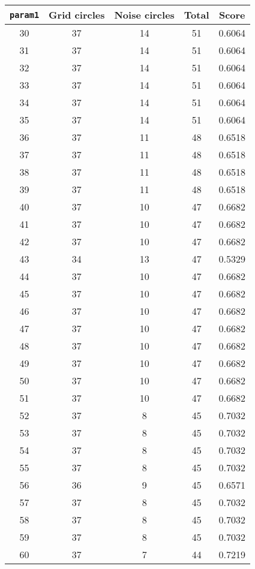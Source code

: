 \documentclass[letterpaper, 12pt]{article}
\begin{document}
\begin{longtable}{|c|c|c|c|c|}
\hline
\textbf{\texttt{param1}} & \textbf{Grid circles} & \textbf{Noise circles} & \textbf{Total} & \textbf{Score} \\
\hline
30 & 37 & 14 & 51 & 0.6064 \\
\hline
31 & 37 & 14 & 51 & 0.6064 \\
\hline
32 & 37 & 14 & 51 & 0.6064 \\
\hline
33 & 37 & 14 & 51 & 0.6064 \\
\hline
34 & 37 & 14 & 51 & 0.6064 \\
\hline
35 & 37 & 14 & 51 & 0.6064 \\
\hline
36 & 37 & 11 & 48 & 0.6518 \\
\hline
37 & 37 & 11 & 48 & 0.6518 \\
\hline
38 & 37 & 11 & 48 & 0.6518 \\
\hline
39 & 37 & 11 & 48 & 0.6518 \\
\hline
40 & 37 & 10 & 47 & 0.6682 \\
\hline
41 & 37 & 10 & 47 & 0.6682 \\
\hline
42 & 37 & 10 & 47 & 0.6682 \\
\hline
43 & 34 & 13 & 47 & 0.5329 \\
\hline
44 & 37 & 10 & 47 & 0.6682 \\
\hline
45 & 37 & 10 & 47 & 0.6682 \\
\hline
46 & 37 & 10 & 47 & 0.6682 \\
\hline
47 & 37 & 10 & 47 & 0.6682 \\
\hline
48 & 37 & 10 & 47 & 0.6682 \\
\hline
49 & 37 & 10 & 47 & 0.6682 \\
\hline
50 & 37 & 10 & 47 & 0.6682 \\
\hline
51 & 37 & 10 & 47 & 0.6682 \\
\hline
52 & 37 & 8 & 45 & 0.7032 \\
\hline
53 & 37 & 8 & 45 & 0.7032 \\
\hline
54 & 37 & 8 & 45 & 0.7032 \\
\hline
55 & 37 & 8 & 45 & 0.7032 \\
\hline
56 & 36 & 9 & 45 & 0.6571 \\
\hline
57 & 37 & 8 & 45 & 0.7032 \\
\hline
58 & 37 & 8 & 45 & 0.7032 \\
\hline
59 & 37 & 8 & 45 & 0.7032 \\
\hline
60 & 37 & 7 & 44 & 0.7219 \\

\end{longtable}
\end{document}

